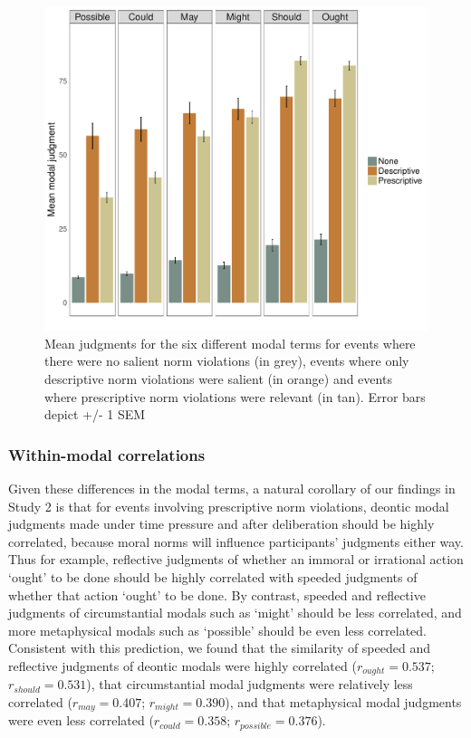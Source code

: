\documentclass[11pt,letterpaper]{article}
\begin{document}
\begin{figure}
    \centering
    \includegraphics[width=.9\linewidth]{fig2a}
    \caption{Mean judgments for the six different modal terms for events where there were no salient norm violations (in grey), events where only descriptive norm violations were salient (in orange) and events where prescriptive norm violations were relevant (in tan). Error bars depict +/- 1 SEM}
    \label{fig2}
\end{figure}

\subsubsection*{Within-modal correlations}

Given these differences in the modal terms, a natural corollary of our findings in Study 2 is that for events involving prescriptive norm violations, deontic modal judgments made under time pressure and after deliberation should be highly correlated, because moral norms will influence participants' judgments either way. Thus for example, reflective judgments of whether an immoral or irrational action `ought' to be done should be highly correlated with speeded judgments of whether that action `ought' to be done. By contrast, speeded and reflective judgments  of circumstantial modals such as `might' should be less correlated, and more metaphysical modals such as `possible' should be even less correlated. Consistent with this prediction, we found that the similarity of speeded and reflective judgments of deontic modals were highly correlated ($r_{ought} = 0.537$; $r_{should} = 0.531$), that circumstantial modal judgments were relatively less correlated ($r_{may} = 0.407$; $r_{might} = 0.390$), and that metaphysical modal judgments were even less correlated ($r_{could} = 0.358$; $r_{possible} = 0.376$).
\end{document}
